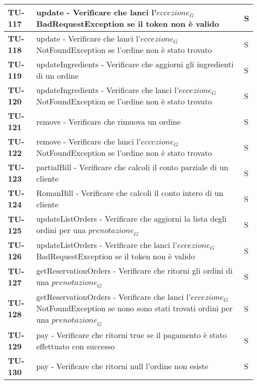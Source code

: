 \begin{longtable}{|>{\centering\arraybackslash}p{2cm}|p{15cm}|p{1cm}|}
  \textbf{TU-117} & update - Verificare che lanci l'$\textit{eccezione}_G$ BadRequestException se il token non è valido & S \\ 
  \hline
  \rowcolor{gray!10}
  \textbf{TU-118} & update - Verificare che lanci l'$\textit{eccezione}_G$ NotFoundException se l'ordine non è stato trovato  & S \\ 
  \hline
  \rowcolor{gray!10}
  \textbf{TU-119} & updateIngredients - Verificare che aggiorni gli ingredienti di un ordine  & S \\ 
  \hline
  \rowcolor{gray!10}
  \textbf{TU-120} & updateIngredients - Verificare che lanci l'$\textit{eccezione}_G$ NotFoundException se l'ordine non è stato trovato  & S \\ 
  \hline
  \rowcolor{gray!10}
  \textbf{TU-121} & remove - Verificare che rimuova un ordine & S \\ 
  \hline
  \rowcolor{gray!10}
  \textbf{TU-122} & remove - Verificare che lanci l'$\textit{eccezione}_G$ NotFoundException se l'ordine non è stato trovato  & S \\ 
  \hline
  \rowcolor{gray!10}
  \textbf{TU-123} & partialBill - Verificare che calcoli il conto parziale di un cliente  & S \\ 
  \hline
  \rowcolor{gray!10}
  \textbf{TU-124} & RomanBill - Verificare che calcoli il conto intero di un cliente  & S \\ 
  \hline
  \rowcolor{gray!10}
  \textbf{TU-125} & updateListOrders - Verificare che aggiorni la lista degli ordini per una $\textit{prenotazione}_G$  & S \\ 
  \hline
  \rowcolor{gray!10}
  \textbf{TU-126} & updateListOrders - Verificare che lanci l'$\textit{eccezione}_G$ BadRequestException se il token non è valido  & S \\ 
  \hline
  \rowcolor{gray!10}
  \textbf{TU-127} & getReservationOrders - Verificare che ritorni gli ordini di una $\textit{prenotazione}_G$  & S \\ 
  \hline
  \rowcolor{gray!10}
  \textbf{TU-128} & getReservationOrders - Verificare che lanci l'$\textit{eccezione}_G$ NotFoundException se nono sono stati trovati ordini per una $\textit{prenotazione}_G$  & S \\ 
  \hline
  \rowcolor{gray!10}
  \textbf{TU-129} & pay - Verificare che ritorni true se il pagamento è stato effettuato con successo  & S \\ 
  \hline
  \rowcolor{gray!10}
  \textbf{TU-130} & pay - Verificare che ritorni null l'ordine non esiste  & S \\ 

\end{longtable}
